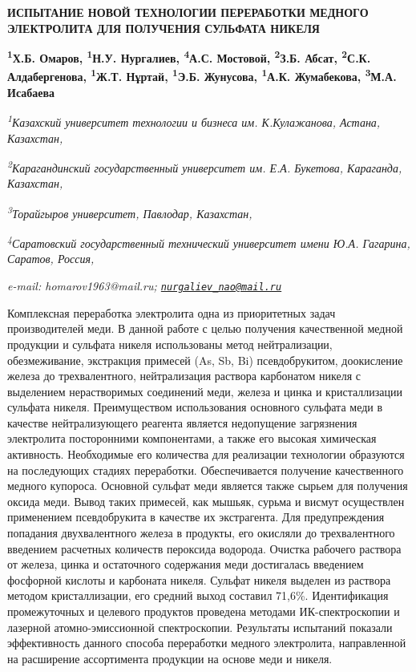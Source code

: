 \begin{articleheader}
{\bfseries ИСПЫТАНИЕ НОВОЙ ТЕХНОЛОГИИ ПЕРЕРАБОТКИ МЕДНОГО ЭЛЕКТРОЛИТА ДЛЯ ПОЛУЧЕНИЯ СУЛЬФАТА НИКЕЛЯ}

{\bfseries
\textsuperscript{1}Х.Б. Омаров\textsuperscript{\envelope },
\textsuperscript{1}Н.У. Нургалиев\textsuperscript{\envelope },
\textsuperscript{4}А.С. Мостовой,
\textsuperscript{2}З.Б. Абсат,
\textsuperscript{2}С.К. Алдабергенова,
\textsuperscript{1}Ж.Т. Нұртай,
\textsuperscript{1}Э.Б. Жунусова,
\textsuperscript{1}А.К. Жумабекова,
\textsuperscript{3}М.А. Исабаева}
\end{articleheader}

\begin{affiliation}
\emph{\textsuperscript{1}Казахский университет технологии и бизнеса им. К.Кулажанова, Астана, Казахстан,}

\emph{\textsuperscript{2}Карагандинский государственный университет им. Е.А. Букетова, Караганда, Казахстан,}

\emph{\textsuperscript{3}Торайгыров университет, Павлодар, Казахстан,}

\emph{\textsuperscript{4}Саратовский государственный технический университет имени Ю.А. Гагарина, Саратов, Россия,}

\emph{e-mail: homarov1963@mail.ru; \href{mailto:nurgaliev_nao@mail.ru}{\nolinkurl{nurgaliev\_nao@mail.ru}}}
\end{affiliation}

Комплексная переработка электролита одна из приоритетных задач
производителей меди. В данной работе с целью получения качественной
медной продукции и сульфата никеля использованы метод нейтрализации,
обезмеживание, экстракция примесей (As, Sb, Bi) псевдобрукитом,
доокисление железа до трехвалентного, нейтрализация раствора карбонатом
никеля с выделением нерастворимых соединений меди, железа и цинка и
кристаллизации сульфата никеля. Преимуществом использования основного
сульфата меди в качестве нейтрализующего реагента является недопущение
загрязнения электролита посторонними компонентами, а также его высокая
химическая активность. Необходимые его количества для реализации
технологии образуются на последующих стадиях переработки. Обеспечивается
получение качественного медного купороса. Основной сульфат меди является
также сырьем для получения оксида меди. Вывод таких примесей, как
мышьяк, сурьма и висмут осуществлен применением псевдобрукита в качестве
их экстрагента. Для предупреждения попадания двухвалентного железа в
продукты, его окисляли до трехвалентного введением расчетных количеств
пероксида водорода. Очистка рабочего раствора от железа, цинка и
остаточного содержания меди достигалась введением фосфорной кислоты и
карбоната никеля. Сульфат никеля выделен из раствора методом
кристаллизации, его средний выход составил 71,6\%. Идентификация
промежуточных и целевого продуктов проведена методами ИК-спектроскопии и
лазерной атомно-эмиссионной спектроскопии. Результаты испытаний показали
эффективность данного способа переработки медного электролита,
направленной на расширение ассортимента продукции на основе меди и
никеля.

